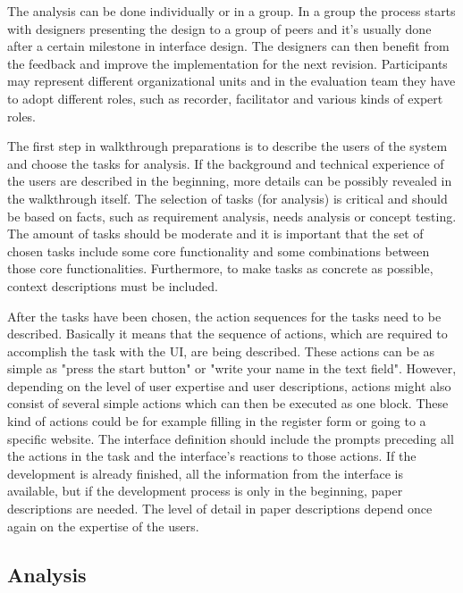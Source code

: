 \documentclass[12pt,a4paper,oneside,pdftex]{report}
\begin{document}
The analysis can be done individually or in a group. In a group the process starts with designers presenting the design to a group of peers and it's usually done after a certain milestone in interface design. The designers can then benefit from the feedback and improve the implementation for the next revision. Participants may represent different organizational units and in the evaluation team they have to adopt different roles, such as recorder, facilitator and various kinds of expert roles. \cite{RefWorks:26}

The first step in walkthrough preparations is to describe the users of the system and choose the tasks for analysis. If the background and technical experience of the users are described in the beginning, more details can be possibly revealed in the walkthrough itself. The selection of tasks (for analysis) is critical and should be based on facts, such as requirement analysis, needs analysis or concept testing. The amount of tasks should be moderate and it is important that the set of chosen tasks include some core functionality and some combinations between those core functionalities. Furthermore, to make tasks as concrete as possible, context descriptions must be included. \cite{RefWorks:26}

After the tasks have been chosen,  the action sequences for the tasks need to be described. Basically it means that the sequence of actions, which are required to accomplish the task with the UI, are being described. These actions can be as simple as "press the start button" or "write your name in the text field". However, depending on the level of user expertise and user descriptions, actions might also consist of several simple actions which can then be executed as one block. These kind of actions could be for example filling in the register form or going to a specific website. The interface definition should include the prompts preceding all the actions in the task and the interface's reactions to those actions. If the development is already finished, all the information from the interface is available, but if the development process is only in the beginning, paper descriptions are needed. The level of detail in paper descriptions depend once again on the expertise of the users. \cite{RefWorks:26}

\subsection{Analysis}
\end{document}
